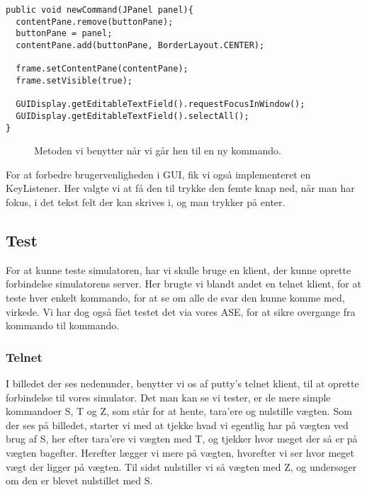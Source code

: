 \documentclass[a4paper]{article}
\begin{document}
\begin{lstlisting}
public void newCommand(JPanel panel){
  contentPane.remove(buttonPane);
  buttonPane = panel;
  contentPane.add(buttonPane, BorderLayout.CENTER);
  
  frame.setContentPane(contentPane);
  frame.setVisible(true);
  
  GUIDisplay.getEditableTextField().requestFocusInWindow();
  GUIDisplay.getEditableTextField().selectAll();
}
\end{lstlisting}
\begin{figure}[h!]
  \caption{Metoden vi benytter når vi går hen til en ny kommando.}
\end{figure}

For at forbedre brugervenligheden i GUI, fik vi også implementeret en KeyListener. Her valgte vi at få den til trykke den femte knap ned, når man har fokus, i det tekst felt der kan skrives i, og man trykker på enter.




\subsection{Test} %

For at kunne teste simulatoren, har vi skulle bruge en klient, der kunne oprette forbindelse simulatorens server. Her brugte vi blandt andet en telnet klient, for at teste hver enkelt kommando, for at se om alle de svar den kunne komme med, virkede. Vi har dog også fået testet det via vores ASE, for at sikre overgange fra kommando til kommando.

\subsubsection{Telnet} %

I billedet der ses nedenunder, benytter vi os af putty’s telnet klient, til at oprette forbindelse til vores simulator. Det man kan se vi tester, er de mere simple kommandoer S, T og Z, som står for at hente, tara’ere og nulstille vægten. Som der ses på billedet, starter vi med at tjekke hvad vi egentlig har på vægten ved brug af S, her efter tara’ere vi vægten med T, og tjekker hvor meget der så er på vægten bagefter. Herefter lægger vi mere på vægten, hvorefter vi ser hvor meget vægt der ligger på vægten. Til sidst nulstiller vi så vægten med Z, og undersøger om den er blevet nulstillet med S.
\end{document}
